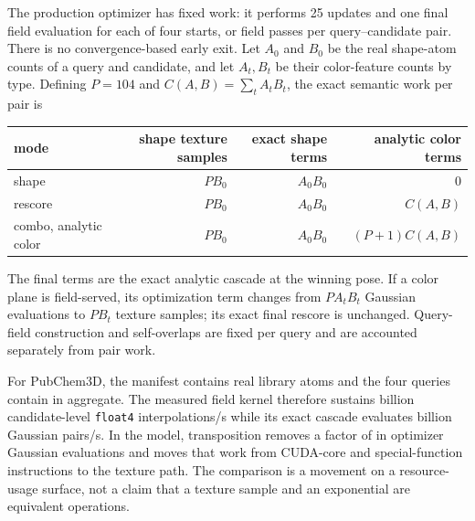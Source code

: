 The production optimizer has fixed work: it performs 25 updates and one final
field evaluation for each of four starts, or
\RooflineFieldPassesPerPair{} field passes per query--candidate pair. There is
no convergence-based early exit. Let $A_0$ and $B_0$ be the real shape-atom
counts of a query and candidate, and let $A_t,B_t$ be their color-feature
counts by type. Defining $P=104$ and $C(A,B)=\sum_t A_tB_t$, the exact semantic
work per pair is
\begin{center}
\begin{tabular}{@{}lrrr@{}}
\toprule
mode & shape texture samples & exact shape terms & analytic color terms \\
\midrule
shape & $PB_0$ & $A_0B_0$ & 0 \\
rescore & $PB_0$ & $A_0B_0$ & $C(A,B)$ \\
combo, analytic color & $PB_0$ & $A_0B_0$ & $(P+1)C(A,B)$ \\
\bottomrule
\end{tabular}
\end{center}
The final terms are the exact analytic cascade at the winning pose. If a color
plane is field-served, its optimization term changes from $PA_tB_t$ Gaussian
evaluations to $PB_t$ texture samples; its exact final rescore is unchanged.
Query-field construction and self-overlaps are fixed per query and are
accounted separately from pair work.



For PubChem3D, the manifest contains \DfiveLibraryRealAtoms{} real library atoms and
the four queries contain \DfiveQueryRealAtomsSum{} in aggregate. The measured
field kernel therefore sustains
\DfiveFieldBillionTextureSamplesPerSecond{} billion candidate-level
\texttt{float4} interpolations/s while its exact cascade evaluates
\DfiveFieldBillionExactGaussianTermsPerSecond{} billion Gaussian pairs/s. In
the model, transposition removes a factor of
\FieldOptimizerGaussianReductionFactor{} in optimizer Gaussian evaluations and
moves that work from CUDA-core and special-function instructions to the
texture path. The comparison is a movement on a resource-usage surface, not a
claim that a texture sample and an exponential are equivalent operations.

